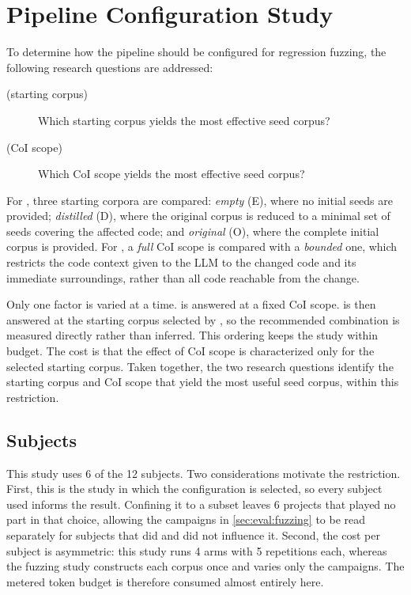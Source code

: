 \section{Pipeline Configuration Study}\label{sec:eval:seedgen}
To determine how the pipeline should be configured for regression fuzzing, the following research questions are addressed:

\begin{description}
  \item[ (starting corpus)] Which starting corpus yields the most effective seed corpus?
  \item[ (\ac{CoI} scope)] Which \ac{CoI} scope yields the most effective seed corpus?
\end{description}

For , three starting corpora are compared: \emph{empty} (E), where no initial seeds are provided; \emph{distilled} (D), where the original corpus is reduced to a minimal set of seeds covering the affected code; and \emph{original} (O), where the complete initial corpus is provided.
For , a \emph{full} \ac{CoI} scope is compared with a \emph{bounded} one, which restricts the code context given to the LLM to the changed code and its immediate surroundings, rather than all code reachable from the change.

Only one factor is varied at a time.
 is answered at a fixed \ac{CoI} scope.
 is then answered at the starting corpus selected by , so the recommended combination is measured directly rather than inferred.
This ordering keeps the study within budget.
The cost is that the effect of \ac{CoI} scope is characterized only for the selected starting corpus.
Taken together, the two research questions identify the starting corpus and \ac{CoI} scope that yield the most useful seed corpus, within this restriction.

\subsection{Subjects}\label{sec:eval:seedgen:subjects}
This study uses \num{6} of the \num{12} subjects.
Two considerations motivate the restriction.
First, this is the study in which the configuration is selected, so every subject used informs the result.
Confining it to a subset leaves \num{6} projects that played no part in that choice, allowing the campaigns in \autoref{sec:eval:fuzzing} to be read separately for subjects that did and did not influence it.
Second, the cost per subject is asymmetric: this study runs \num{4} arms with \num{5} repetitions each, whereas the fuzzing study constructs each corpus once and varies only the campaigns.
The metered token budget is therefore consumed almost entirely here.

